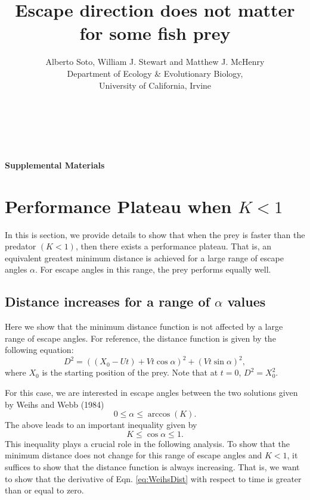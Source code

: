 \documentclass[12pt]{article}
\title{Escape direction does not matter for some fish prey}
\author{Alberto Soto, William J. Stewart and Matthew J. McHenry\\
  Department of Ecology \& Evolutionary Biology,\\
  University of California, Irvine\\ \\ \\ \\}
\begin{document}

{\Large \textbf{Supplemental Materials}}


\section{Performance Plateau when $K < 1$}
In this is section, we provide details to show that when the prey is faster than the predator $(K<1)$, then there exists a performance plateau. That is, an equivalent greatest minimum distance is  achieved for a large range of escape angles $\alpha$. For escape angles in this range, the prey performs equally well.   

\subsection{Distance increases for a range of $\alpha$ values}
Here we show that the minimum distance function is not affected by a large range of escape angles. For reference, the distance function is given by the following equation:
%
\begin{equation}
D^2 = ((X_0 - Ut) + Vt\cos\alpha)^2 + (Vt\sin\alpha)^2,
\label{eq:WeihsDist}
\end{equation}
%
where $X_0$ is the starting position of the prey. Note that at $t=0$, $D^2 = X_0^2.$ 

For this case, we are interested in escape angles between the two solutions given by Weihs and Webb (1984)
%
\begin{equation}
0 \leq \alpha \leq \arccos(K).
\label{alpharange}
\end{equation}
The above leads to an important inequality given by
\begin{equation}
K \leq \cos\alpha \leq 1.
\label{cosinebound}
\end{equation} 
This inequality plays a crucial role in the following analysis.      
%
To show that the minimum distance does not change for this range of escape angles and $K<1$, it suffices to show that the distance function is always increasing. That is, we want to show that the derivative of Eqn. \ref{eq:WeihsDist} with respect to time is greater than or equal to zero. 
\end{document}
